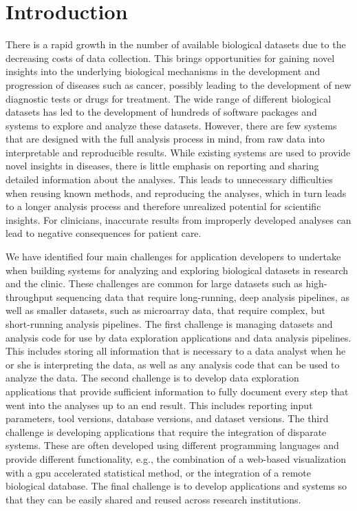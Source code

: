 \chapter{Introduction}
There is a rapid growth in the number of available biological datasets due to
the decreasing costs of data collection. This brings opportunities for gaining
novel insights into the underlying biological mechanisms in the development and
progression of diseases such as cancer, possibly leading to the development of
new diagnostic tests or drugs for treatment. The wide range of different
biological datasets has led to the development of hundreds of software packages
and systems to explore and analyze these datasets. However, there are few
systems that are designed with the full analysis process in mind, from raw data
into interpretable and reproducible results.  While existing systems are used to
provide novel insights in diseases, there is little emphasis on reporting and
sharing detailed information about the analyses. This leads to unnecessary
difficulties when reusing known methods, and reproducing the analyses, which in
turn leads to a longer analysis process and therefore unrealized potential for
scientific insights. For clinicians, inaccurate results from improperly
developed analyses can lead to negative consequences for patient
care.\cite{roy2017standards}

We have identified four main challenges for application developers to undertake
when building systems for analyzing and exploring biological datasets in
research and the clinic. These challenges are common for large datasets such as
high-throughput sequencing data that require long-running, deep analysis
pipelines, as well as smaller datasets, such as microarray data, that require
complex, but short-running analysis pipelines. The first challenge is managing
datasets and analysis code for use by data exploration applications and data
analysis pipelines. This includes storing all information that is necessary to a
data analyst when he or she is interpreting the data, as well as any analysis
code that can be used to analyze the data. The second challenge is to develop
data exploration applications that provide sufficient information to fully
document every step that went into the analyses up to an end result. This
includes reporting input parameters, tool versions, database versions, and
dataset versions. The third challenge is developing applications that require
the integration of disparate systems. These are often developed using different
programming languages and provide different functionality, e.g., the combination
of a web-based visualization with a \gls{gpu} accelerated statistical method, or
the integration of a remote biological database.  The final challenge is to
develop applications and systems so that they can be easily shared and reused
across research institutions. 


